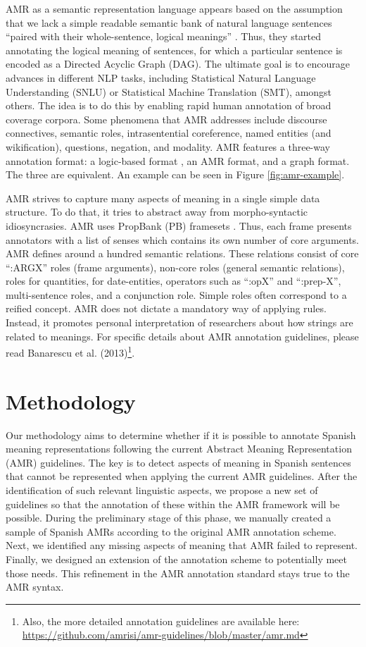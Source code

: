 \documentclass[10pt, a4paper]{article}
\begin{document}
AMR as a semantic representation language appears based on the assumption that we lack a simple readable semantic bank of natural language sentences ``paired with their whole-sentence, logical meanings'' \cite{banarescu2013abstract}. Thus, they started annotating the logical meaning of sentences, for which a particular sentence is encoded as a Directed Acyclic Graph (DAG). The ultimate goal is to encourage advances in different NLP tasks, including Statistical Natural Language Understanding (SNLU) or Statistical Machine Translation (SMT), amongst others. The idea is to do this by enabling rapid human annotation of broad coverage corpora. Some phenomena that AMR addresses include discourse connectives, semantic roles, intrasentential coreference, named entities (and wikification), questions, negation, and modality. AMR features a three-way annotation format: a logic-based format \cite{Davidson:1980}, an AMR format, and a graph format. The three are equivalent. An example can be seen in Figure \ref{fig:amr-example}.

AMR strives to capture many aspects of meaning in a single simple data structure. To do that, it tries to abstract away from morpho-syntactic idiosyncrasies. AMR uses PropBank (PB) framesets \cite{kingsbury_treebank_2002}. Thus, each frame presents annotators with a list of senses which contains its own number of core arguments. AMR defines around a hundred semantic relations. These relations consist of core ``:ARGX'' roles (frame arguments), non-core roles (general semantic relations), roles for quantities, for date-entities, operators such as ``:opX'' and ``:prep-X'', multi-sentence roles, and a conjunction role. Simple roles often correspond to a reified concept. AMR does not dictate a mandatory way of applying rules. Instead, it promotes personal interpretation of researchers about how strings are related to meanings. For specific details about AMR annotation guidelines, please read Banarescu et al. (2013)\footnote{Also, the more detailed annotation guidelines are available here: \url{https://github.com/amrisi/amr-guidelines/blob/master/amr.md}}.

\section{Methodology}\label{sec:methodology}

Our methodology aims to determine whether if it is possible to annotate Spanish meaning representations following the current Abstract Meaning Representation (AMR) guidelines. The key is to detect aspects of meaning in Spanish sentences that cannot be represented when applying the current AMR guidelines. After the identification of such relevant linguistic aspects, we propose a new set of guidelines so that the annotation of these within the AMR framework will be possible. During the preliminary stage of this phase, we manually created a sample of Spanish AMRs according to the original AMR annotation scheme. Next, we identified any missing aspects of meaning that AMR failed to represent. Finally, we designed an extension of the annotation scheme to potentially meet those needs. This refinement in the AMR annotation standard stays true to the AMR syntax.
\end{document}

